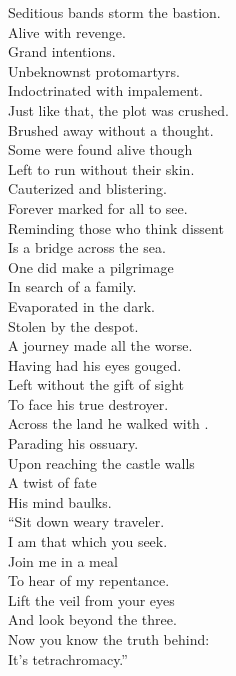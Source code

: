 Seditious bands storm the bastion. \\
Alive with revenge. \\
Grand intentions. \\
Unbeknownst protomartyrs. \\
Indoctrinated with impalement. \\

Just like that, the plot was crushed. \\
Brushed away without a thought. \\
Some were found alive though \\
Left to run without their skin. \\
Cauterized and blistering. \\
Forever marked for all to see. \\
Reminding those who think dissent \\
Is a bridge across the sea. \\

One did make a pilgrimage \\
In search of a family. \\
Evaporated in the dark. \\
Stolen by the despot. \\
A journey made all the worse. \\
Having had his eyes gouged. \\
Left without the gift of sight \\
To face his true destroyer. \\

Across the land he walked with . \\
Parading his ossuary. \\
Upon reaching the castle walls \\
A twist of fate \\
His mind baulks. \\

``Sit down weary traveler. \\
I am that which you seek. \\
Join me in a meal \\
To hear of my repentance. \\
Lift the veil from your eyes \\
And look beyond the three. \\
Now you know the truth behind: \\
It's tetrachromacy.'' \\



